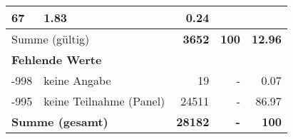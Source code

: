 \begin{longtable}{lXrrr}
       \num{67} &
       \num[round-mode=places,round-precision=2]{1.83} &
         \num[round-mode=places,round-precision=2]{0.24} \\
     \midrule
     \multicolumn{2}{l}{Summe (gültig)} &
       \textbf{\num{3652}} &
     \textbf{\num{100}} &
       \textbf{\num[round-mode=places,round-precision=2]{12.96}} \\
     \multicolumn{5}{l}{\textbf{Fehlende Werte}}\\
       -998 &
       keine Angabe &
         \num{19} &
        - &
         \num[round-mode=places,round-precision=2]{0.07} \\
       -995 &
       keine Teilnahme (Panel) &
         \num{24511} &
        - &
         \num[round-mode=places,round-precision=2]{86.97} \\
     \midrule
     \multicolumn{2}{l}{\textbf{Summe (gesamt)}} &
          \textbf{\num{28182}} &
        \textbf{-} &
        \textbf{\num{100}} \\
     \bottomrule
     \end{longtable}
     
